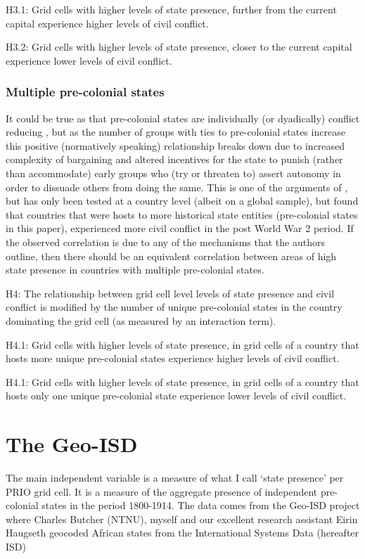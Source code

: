 \documentclass[12pt]{article}
\begin{document}
\begin{multicols}{2}
H3.1: Grid cells with higher levels of state presence, further from the current capital 
experience higher levels of civil conflict.

H3.2:  Grid cells with higher levels of state presence, closer to the current capital 
experience lower levels of civil conflict.

\subsubsection{Multiple pre-colonial states}

It could be true as that pre-colonial states are individually (or dyadically)
conflict reducing \citep{Pinker2012, Wig2016}, but as the number of groups with
ties to pre-colonial states increase this positive (normatively speaking)
relationship breaks down due to increased complexity of bargaining
\citep{Walter2009} and altered incentives for the state to punish (rather than
accommodate) early groups who (try or threaten to) assert autonomy in order to
dissuade others from doing the same. This is one of the arguments of
\citet{Wishman}, but has only been tested at a country level (albeit on a global
sample), but found that countries that were hosts to more historical state
entities (pre-colonial states in this paper), experienced more civil conflict in
the post World War 2 period. If the observed correlation is due to any of the
mechanisms that the authors outline, then there should be an equivalent
correlation between areas of high state presence in countries with multiple
pre-colonial states.

H4: The relationship between grid cell level levels of state presence and civil
conflict is modified by the number of unique pre-colonial states in the country
dominating the grid cell (as measured by an interaction term).

H4.1: Grid cells with higher levels of state presence, in grid cells of a
country that hosts more unique pre-colonial states experience higher levels of
civil conflict.

H4.1: Grid cells with higher levels of state presence, in grid cells of a
country that hosts only one unique pre-colonial state experience lower levels of
civil conflict.

\section{The Geo-ISD}

The main independent variable is a measure of what I call `state presence' per
PRIO grid cell. It is a measure of the aggregate presence of independent
pre-colonial states in the period 1800-1914. The data comes from the Geo-ISD
project where Charles Butcher (NTNU), myself and our excellent research
assistant Eirin Haugseth geocoded African states from the International Systems
Data (hereafter ISD) \citep{Griffiths2013}

\end{multicols}
\end{document}
